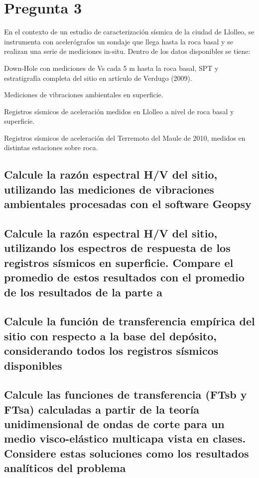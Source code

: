 \newpage
\section{Pregunta 3}

En el contexto de un estudio de caracterización sísmica de la ciudad de Llolleo, se instrumenta con acelerógrafos un sondaje que llega hasta la roca basal y se realizan una serie de mediciones in-situ. Dentro de los datos disponibles se tiene:

\begin{itemizebf}
	\item Down-Hole con mediciones de Vs cada 5 m hasta la roca basal, SPT y estratigrafía completa del sitio en artículo de Verdugo (2009).
	\item Mediciones de vibraciones ambientales en superficie.
	\item Registros sísmicos de aceleración medidos en Llolleo a nivel de roca basal y superficie.
	\item Registros sísmicos de aceleración del Terremoto del Maule de 2010, medidos en distintas estaciones sobre roca.
\end{itemizebf}

\subsection{Calcule la razón espectral H/V del sitio, utilizando las mediciones de vibraciones ambientales procesadas con el software Geopsy}


\subsection{Calcule la razón espectral H/V del sitio, utilizando los espectros de respuesta de los registros sísmicos en superficie. Compare el promedio de estos resultados con el promedio de los resultados de la parte a}


\subsection{Calcule la función de transferencia empírica del sitio con respecto a la base del depósito, considerando todos los registros sísmicos disponibles}


\subsection{Calcule las funciones de transferencia (FTsb y FTsa) calculadas a partir de la teoría unidimensional de ondas de corte para un medio visco-elástico multicapa vista en clases. Considere estas soluciones como los resultados analíticos del problema}


